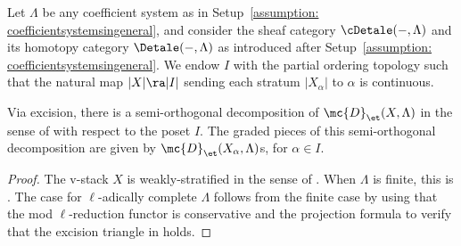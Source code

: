 \documentclass[letterpaper,11pt]{amsart}
\begin{document}
Let $\Lambda$ be any coefficient system as in Setup~\ref{assumption: coefficientsystemsingeneral}, and consider the sheaf category $\cDetale(-,\Lambda)$ and its homotopy category $\Detale(-,\Lambda)$ as introduced after Setup~\ref{assumption: coefficientsystemsingeneral}. We endow $I$ with the partial ordering topology such that the natural map $|X| \ra |I|$ sending each stratum $|X_{\alpha}|$ to $\alpha$ is continuous.
\begin{lemma}\label{lem: excision}
    Via excision, there is a semi-orthogonal decomposition of $\mc{D}_\et(X,\Lambda)$ in the sense of \cite[Definition~6.2.1]{GHILZIsocComparison} with respect to the poset $I$. The graded pieces of this semi-orthogonal decomposition are given by $\mc{D}_\et(X_\alpha,\Lambda)$s, for $\alpha\in I$.
\end{lemma}
\begin{proof}
    The v-stack $X$ is weakly-stratified in the sense of \cite[\S 6.3]{GHILZIsocComparison}. When $\Lambda$ is finite, this is {\cite[Proposition 6.3.1(1)]{GHILZIsocComparison}}. The case for $\ell$-adically complete $\Lambda$ follows from the finite case by using that the mod $\ell$-reduction functor is conservative and the projection formula to verify that the excision triangle in \cite[Definition~6.2.1 (3)]{GHILZIsocComparison} holds. 
\end{proof}
\end{document}
